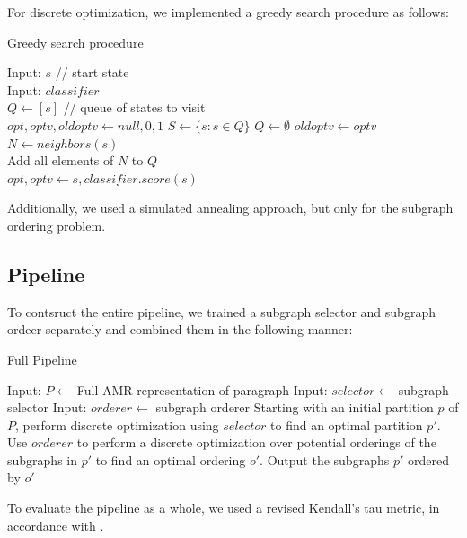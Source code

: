 \documentclass[12pt]{article}
\begin{document}
For discrete optimization, we implemented a greedy search procedure as follows:
\begin{algorithm}
\caption{Greedy search procedure}
\label{greedy_search_alg}
\begin{algorithmic}
\STATE Input: $s$ // start state \\
\STATE Input: $classifier$ \\
\STATE $Q \gets [s]$ // queue of states to visit \\
\STATE $opt, optv, oldoptv \gets null, 0, 1$
    \STATE $S \gets \{s: s \in Q \}$
    \STATE $Q \gets \emptyset$
    \STATE $oldoptv \gets optv$
        \STATE $N \gets neighbors(s)$\\
        \STATE Add all elements of $N$ to $Q$\\
            \STATE $opt, optv \gets s, classifier.score(s)$\\
        \ENDIF
    \ENDFOR
\ENDWHILE
\end{algorithmic}
\end{algorithm}

Additionally, we used a simulated annealing approach, but only for the
subgraph ordering problem.

\subsection{Pipeline}

To contsruct the entire pipeline, we trained a subgraph selector and subgraph
ordeer separately and combined them in the following manner:

\begin{algorithm}
\caption{Full Pipeline}
\label{pipeline_procedure}
\begin{algorithmic}
\STATE Input: $P \gets$ Full AMR representation of paragraph
\STATE Input: $selector \gets$ subgraph selector
\STATE Input: $orderer \gets$ subgraph orderer
\STATE Starting with an initial partition $p$ of $P$, perform discrete
optimization using $selector$ to find an optimal partition $p'$.
\STATE Use $orderer$ to perform a discrete optimization over potential
orderings of the subgraphs in $p'$ to find an optimal ordering $o'$.
\STATE Output the subgraphs $p'$ ordered by $o'$
\end{algorithmic}
\end{algorithm}

To evaluate the pipeline as a whole, we used a revised Kendall's tau metric, in
accordance with \cite{lapata2006automatic}.
\end{document}
